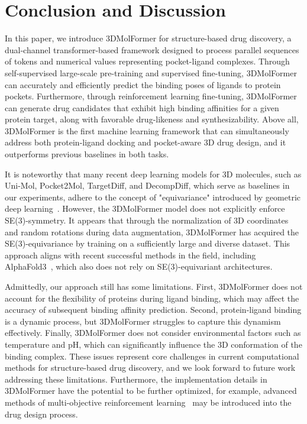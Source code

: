 \section{Conclusion and Discussion}
In this paper, we introduce 3DMolFormer for structure-based drug discovery, a dual-channel transformer-based framework designed to process parallel sequences of tokens and numerical values representing pocket-ligand complexes. Through self-supervised large-scale pre-training and supervised fine-tuning, 3DMolFormer can accurately and efficiently predict the binding poses of ligands to protein pockets. Furthermore, through reinforcement learning fine-tuning, 3DMolFormer can generate drug candidates that exhibit high binding affinities for a given protein target, along with favorable drug-likeness and synthesizability. Above all, 3DMolFormer is the first machine learning framework that can simultaneously address both protein-ligand docking and pocket-aware 3D drug design, and it outperforms previous baselines in both tasks.

It is noteworthy that many recent deep learning models for 3D molecules, such as Uni-Mol, Pocket2Mol, TargetDiff, and DecompDiff, which serve as baselines in our experiments, adhere to the concept of "equivariance" introduced by geometric deep learning~\citep{Equivariance,Equivariance2}. However, the 3DMolFormer model does not explicitly enforce SE(3)-symmetry. It appears that through the normalization of 3D coordinates and random rotations during data augmentation, 3DMolFormer has acquired the SE(3)-equivariance by training on a sufficiently large and diverse dataset. This approach aligns with recent successful methods in the field, including AlphaFold3~\citep{AlphaFold3}, which also does not rely on SE(3)-equivariant architectures.

Admittedly, our approach still has some limitations. First, 3DMolFormer does not account for the flexibility of proteins during ligand binding, which may affect the accuracy of subsequent binding affinity prediction. Second, protein-ligand binding is a dynamic process, but 3DMolFormer struggles to capture this dynamism effectively. Finally, 3DMolFormer does not consider environmental factors such as temperature and pH, which can significantly influence the 3D conformation of the binding complex. These issues represent core challenges in current computational methods for structure-based drug discovery, and we look forward to future work addressing these limitations. Furthermore, the implementation details in 3DMolFormer have the potential to be further optimized, for example, advanced methods of multi-objective reinforcement learning~\citep{MORL} may be introduced into the drug design process.